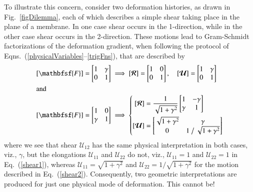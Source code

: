 To illustrate this concern, consider two deformation histories, as drawn in Fig.~\ref{figDilemma}, each of which describes a simple shear taking place in the plane of a membrane.  In one case shear occurs in the 1-direction, while in the other case shear occurs in the 2-direction.  These motions lead to Gram-Schmidt factorizations of the deformation gradient, when following the protocol of Eqns.~(\ref{physicalVariables}--\ref{trigFns}), that are described by
\begin{subequations}
	\label{shears}
	\begin{align}
	[ \mathbfsf{F} ] = 
	\begin{bmatrix} 1 & \gamma \\ 0 & 1 \end{bmatrix} & \implies 
	[ \boldsymbol{\mathcal{R}} ] = 
	\begin{bmatrix} 1 & 0 \\ 0 & 1 \end{bmatrix} , \quad
	[ \boldsymbol{\mathcal{U}} ] = 
	\begin{bmatrix} 1 & \gamma \\ 0 & 1  \end{bmatrix} 
	\label{shear1} \\
	\intertext{and}
	[ \mathbfsf{F} ] = 
	\begin{bmatrix} 1 & 0 \\ \gamma & 1 \end{bmatrix} & \implies \left\{
	\begin{aligned} \mbox{}
	[ \boldsymbol{\mathcal{R}} ] & = \frac{1}{\sqrt{1 + \gamma^2}}
	\begin{bmatrix} 1 & -\gamma \\ \gamma & 1 \end{bmatrix} \\
	[ \boldsymbol{\mathcal{U}} ] & = 
	\begin{bmatrix} \sqrt{1 + \gamma^2} & \gamma \\ 
	0 & 1 \bigm/ \sqrt{1 + \gamma^2} \end{bmatrix}
	\end{aligned} \right.
	\label{shear2}
	\end{align}
\end{subequations}
where we see that shear $\mathcal{U}_{12}$ has the same physical interpretation in both cases, viz., $\gamma$, but the elongations $\mathcal{U}_{11}$ and $\mathcal{U}_{22}$ do not, viz., $\mathcal{U}_{11}=1$ and $\mathcal{U}_{22}=1$ in Eq.~(\ref{shear1}), whereas $\mathcal{U}_{11} = \sqrt{1 + \gamma^2}$ and $\mathcal{U}_{22} = 1 / \sqrt{1 + \gamma^2}$ for the motion described in Eq.~(\ref{shear2}).  Consequently, two geometric interpretations are produced for just one physical mode of deformation.  This cannot be!

